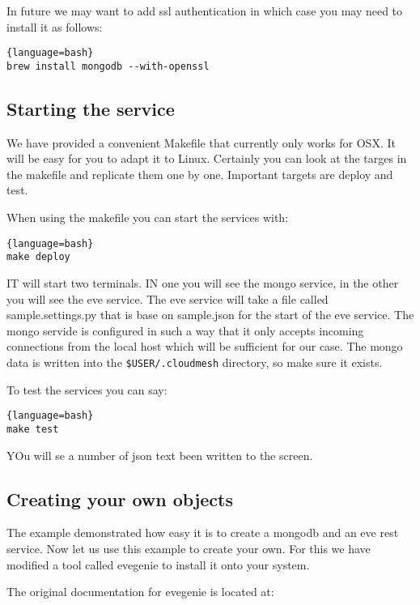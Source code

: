 In future we may want to add ssl authentication in which case you
may
need to install it as follows:

\begin{lstlisting}{language=bash}
brew install mongodb --with-openssl
\end{lstlisting}

\subsection{Starting the service}\label{starting-the-service}

We have provided a convenient Makefile that currently only works for
OSX. It will be easy for you to adapt it to Linux. Certainly you can
look at the targes in the makefile and replicate them one by one.
Important targets are deploy and test.

When using the makefile you can start the services with:

\begin{lstlisting}{language=bash}
make deploy
\end{lstlisting}

IT will start two terminals. IN one you will see the mongo service, in
the other you will see the eve service. The eve service will take a file
called sample.settings.py that is base on sample.json for the start of
the eve service. The mongo servide is configured in such a way that it
only accepts incoming connections from the local host which will be
sufficient for our case. The mongo data is written into the
\verb|$USER/.cloudmesh| directory, so make sure it exists.

To test the services you can say:

\begin{lstlisting}{language=bash}
make test
\end{lstlisting}

YOu will se a number of json text been written to the screen.

\subsection{Creating your own objects}\label{creating-your-own-objects}

The example demonstrated how easy it is to create a mongodb and an eve
rest service. Now let us use this example to create your own. For
this we have modified a tool called evegenie to install it onto your
system.

The original documentation for evegenie is located at:

